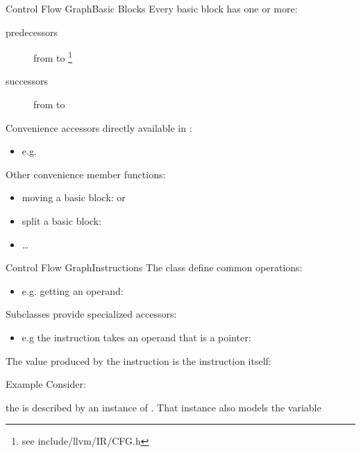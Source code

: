 \begin{frame}{Control Flow Graph}{Basic Blocks}
Every basic block  has one or more:

\begin{description}
\item[predecessors] from  to
       \footnote{see include/llvm/IR/CFG.h}
\item[successors] from  to
\end{description}

\vfill
Convenience accessors directly available in :

\begin{itemize}
\item e.g. 
\end{itemize}

Other convenience member functions:

\begin{itemize}
\item moving a basic block:
       or
\item split a basic block:
\item \ldots
\end{itemize}
\end{frame}

\begin{frame}{Control Flow Graph}{Instructions}
The  class define common operations:

\begin{itemize}
\item e.g. getting an operand: 
\end{itemize}

Subclasses provide specialized accessors:

\begin{itemize}
\item e.g the  instruction takes an operand that is a pointer:
\end{itemize}

\pause
\vfill
The value produced by the instruction is the \alert{instruction itself}:

\begin{block}{Example}
Consider:

\centering
{}

\flushleft
the  is described
by an instance of . That instance also models the
 variable
\end{block}
\end{frame}

